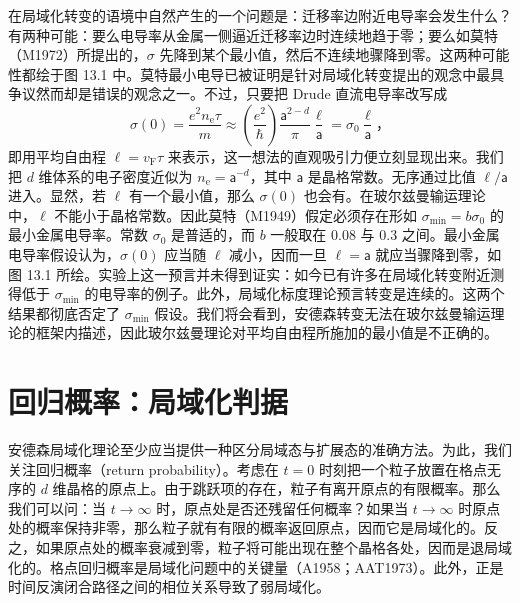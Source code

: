 在局域化转变的语境中自然产生的一个问题是：迁移率边附近电导率会发生什么？有两种可能：要么电导率从金属一侧逼近迁移率边时连续地趋于零；要么如莫特（M1972）所提出的，$\sigma$ 先降到某个最小值，然后不连续地骤降到零。这两种可能性都绘于图 13.1 中。莫特最小电导已被证明是针对局域化转变提出的观念中最具争议然而却是错误的观念之一。不过，只要把 Drude 直流电导率改写成
\begin{equation*}
\sigma(0)=\frac{e^{2}n_{\mathrm{e}}\tau}{m}\approx\left(\frac{e^{2}}{\hbar}\right)\frac{\mathsf{a}^{2-d}}{\pi}\frac{\ell}{\mathsf{a}}=\sigma_{0}\frac{\ell}{\mathsf{a}}\text{，}\tag{13.2}
\end{equation*}
即用平均自由程 $\ell=v_{\mathrm{F}}\tau$ 来表示，这一想法的直观吸引力便立刻显现出来。我们把 $d$ 维体系的电子密度近似为 $n_{\mathrm{e}}=\mathsf{a}^{-d}$，其中 $\mathsf{a}$ 是晶格常数。无序通过比值 $\ell/\mathsf{a}$ 进入。显然，若 $\ell$ 有一个最小值，那么 $\sigma(0)$ 也会有。在玻尔兹曼输运理论中，$\ell$ 不能小于晶格常数。因此莫特（M1949）假定必须存在形如 $\sigma_{\mathrm{min}}=b\sigma_{0}$ 的最小金属电导率。常数 $\sigma_{0}$ 是普适的，而 $b$ 一般取在 0.08 与 0.3 之间。最小金属电导率假设认为，$\sigma(0)$ 应当随 $\ell$ 减小，因而一旦 $\ell=\mathsf{a}$ 就应当骤降到零，如图 13.1 所绘。实验上这一预言并未得到证实：如今已有许多在局域化转变附近测得低于 $\sigma_{\mathrm{min}}$ 的电导率的例子。此外，局域化标度理论预言转变是连续的。这两个结果都彻底否定了 $\sigma_{\mathrm{min}}$ 假设。我们将会看到，安德森转变无法在玻尔兹曼输运理论的框架内描述，因此玻尔兹曼理论对平均自由程所施加的最小值是不正确的。

\section{回归概率：局域化判据}

安德森局域化理论至少应当提供一种区分局域态与扩展态的准确方法。为此，我们关注回归概率（return probability）。考虑在 $t=0$ 时刻把一个粒子放置在格点无序的 $d$ 维晶格的原点上。由于跳跃项的存在，粒子有离开原点的有限概率。那么我们可以问：当 $t\to\infty$ 时，原点处是否还残留任何概率？如果当 $t\to\infty$ 时原点处的概率保持非零，那么粒子就有有限的概率返回原点，因而它是局域化的。反之，如果原点处的概率衰减到零，粒子将可能出现在整个晶格各处，因而是退局域化的。格点回归概率是局域化问题中的关键量（A1958；AAT1973）。此外，正是时间反演闭合路径之间的相位关系导致了弱局域化。

